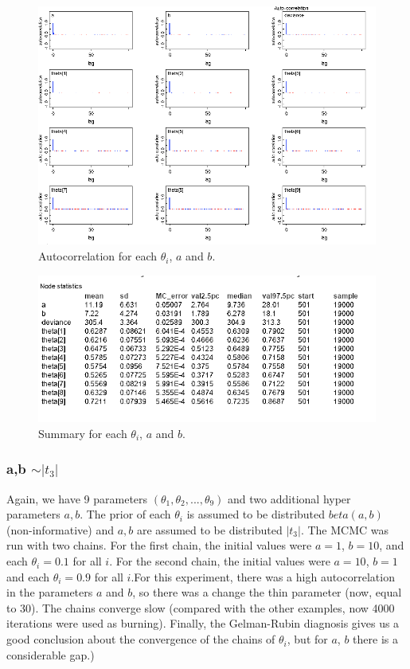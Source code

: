 \documentclass{article}
\begin{document}
  \begin{figure}[ht!]
  \centering
  \includegraphics[width=.8\textwidth]{imgs/M3a_4.png}
  \caption{Autocorrelation for each $\theta_i$, $a$ and $b$.}
  \label{fig:fig10}
  \end{figure}
  \begin{figure}[ht!]
  \centering
  \includegraphics[width=.65\textwidth]{imgs/M3a_5.png}
  \caption{Summary for each $\theta_i$, $a$ and $b$.}
  \label{fig:fig11}
  \end{figure}
  
\newpage
\subsubsection{a,b $\sim |t_3|$}
Again, we have 9 parameters $(\theta_1, \theta_2, ..., \theta_9)$ and two additional hyper parameters $a,b$. The prior of each $\theta_i$ is assumed to be distributed $beta(a,b)$ (non-informative) and $a,b$ are assumed to be distributed $|t_3|$. The MCMC was run with two chains. For the first chain, the initial values were $a = 1$, $b = 10$, and each $\theta_i = 0.1$ for all $i$. For the second chain, the initial values were $a = 10$, $b = 1$ and each $\theta_i = 0.9$ for all $i$.For this experiment, there was a high autocorrelation in the parameters $a$ and $b$, so there was a change the thin parameter (now, equal to 30). The chains converge slow (compared with the other examples, now 4000 iterations were used as burning). Finally, the Gelman-Rubin diagnosis gives us a good conclusion about the convergence of the chains of $\theta_i$, but for $a$, $b$ there is a considerable gap.)
  
\end{document}
